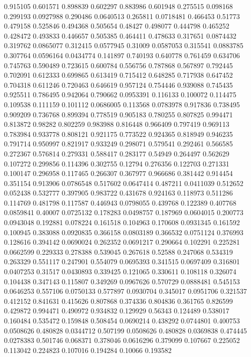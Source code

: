 0.915105 0.601571
0.898839 0.602297
0.883986 0.601948
0.275515 0.098168
0.299193 0.0927988
0.290486 0.0640513
0.265811 0.0718481
0.466453 0.51773
0.479158 0.525846
0.494368 0.505654
0.48427 0.498077
0.444798 0.465252
0.428472 0.493833
0.446657 0.505385
0.464411 0.478633
0.317651 0.0874432
0.319762 0.0865077
0.312415 0.0577945
0.31009 0.0587053
0.315541 0.0883785
0.307764 0.0596164
0.0434774 0.141897
0.740193 0.640778
0.761459 0.634706
0.745763 0.590489
0.723615 0.600784
0.556756 0.787868
0.567897 0.792445
0.702091 0.612333
0.699865 0.613419
0.715412 0.648285
0.717938 0.647452
0.704318 0.611246
0.720463 0.646619
0.957124 0.754446
0.939088 0.745435
0.925511 0.786495
0.942064 0.790662
0.0953391 0.116133
0.100072 0.114475
0.109538 0.111159
0.101112 0.0686005
0.113568 0.0783978
0.917836 0.738495
0.909209 0.736768
0.899394 0.778519
0.905183 0.780255
0.807825 0.994471
0.813872 0.98282
0.802259 0.983988
0.816448 0.966409
0.797419 0.969113
0.783984 0.933778
0.808121 0.921175
0.773522 0.924365
0.818949 0.946235
0.791714 0.950997
0.821917 0.933249
0.298071 0.579541
0.292461 0.566585
0.272367 0.576814
0.279331 0.588417
0.283177 0.54949
0.264497 0.562629
0.107272 0.299856
0.114396 0.302755
0.12794 0.276356
0.122703 0.271331
0.100147 0.296958
0.117465 0.266307
0.367977 0.966686
0.381442 0.914454
0.351154 0.913906
0.0786548 0.517602
0.0647414 0.487211
0.0411039 0.512652
0.052438 0.532777
0.397905 0.983722
0.431678 0.924163
0.118973 0.511286
0.114769 0.481798
0.117587 0.446943
0.0798055 0.439768
0.122389 0.407768
0.0859841 0.40007
0.0725132 0.178283
0.0498757 0.187969
0.0604015 0.200773
0.0943048 0.192881
0.078224 0.161518
0.104963 0.170608
0.0931345 0.161592
0.100945 0.383088
0.0920835 0.366158
0.0803189 0.366532
0.0751124 0.376993
0.128616 0.394142
0.0690024 0.262352
0.0691217 0.290664
0.102291 0.225281
0.0662599 0.229333
0.278388 0.539045
0.267618 0.52588
0.247068 0.534319
0.263329 0.551117
0.247901 0.554079
0.0695393 0.341515
0.0697409 0.316801
0.0407253 0.31517
0.0430893 0.339425
0.121065 0.330611
0.108118 0.326074
0.104438 0.347143
0.115807 0.349269
0.0967626 0.570729
0.0888481 0.545153
0.0646253 0.557106
0.0750133 0.577897
0.0930704 0.345017
0.0951706 0.321537
0.412152 0.841631
0.415626 0.807868
0.374336 0.804836
0.361765 0.826599
0.429872 0.994471
0.490972 0.934832
0.129929 0.56343
0.124489 0.538017
0.160484 0.535472
0.159848 0.508454
0.0690214 0.438292
0.0744801 0.400753
0.0508626 0.480828
0.0344712 0.507199
0.0508626 0.480828
0.0369838 0.474445
0.0278383 0.501746
0.068371 0.378046
0.0616296 0.379099
0.107667 0.225052
0.113042 0.224823
0.107016 0.194284
0.10066 0.193582
